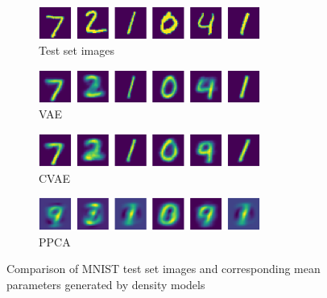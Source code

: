 \begin{figure}[H]
	\begin{subfigure}[t]{1\textwidth}
		\centering
		\includegraphics[width = 0.8\textwidth]{figures/ppca/real}
		\caption{Test set images}
		\label{fig:ppca:real}
	\end{subfigure}
	\begin{subfigure}[t]{1\textwidth}
		\centering
		\includegraphics[width = 0.8\textwidth]{figures/vae/mean}
		\caption{VAE}
		\label{fig:vae:mean}
	\end{subfigure}
	\begin{subfigure}[t]{1\textwidth}
		\centering
		\includegraphics[width = 0.8\textwidth]{figures/cvae/mean}
		\caption{CVAE}
		\label{fig:cvae:mean}
	\end{subfigure}
	\begin{subfigure}[t]{1\textwidth}
		\centering
		\includegraphics[width = 0.8\textwidth]{figures/ppca/mean}
		\caption{PPCA}
		\label{fig:ppca:mean}
	\end{subfigure}
	\caption{Comparison of MNIST test set images and corresponding mean parameters generated by density models}
	\label{fig:mean}
\end{figure}


